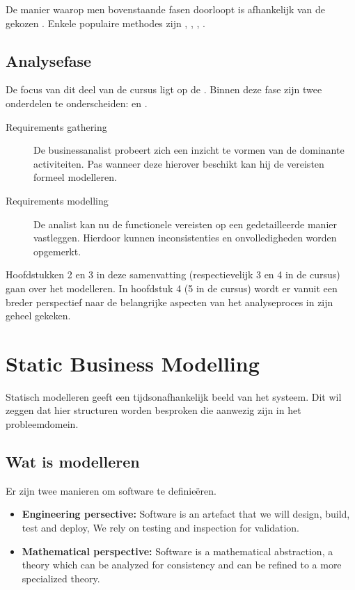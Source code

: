 \documentclass[../main.tex]{subfiles}
\begin{document}
\noindent
De manier waarop men bovenstaande fasen doorloopt is afhankelijk van de gekozen . Enkele populaire methodes zijn , , , .

\section{Analysefase}
De focus van dit deel van de cursus ligt op de . Binnen deze fase zijn twee onderdelen te onderscheiden:  en .

\begin{description}
	\item[Requirements gathering] De businessanalist probeert zich een inzicht te vormen van de dominante activiteiten. Pas wanneer deze hierover beschikt kan hij de vereisten formeel modelleren.
	\item[Requirements modelling] De analist kan nu de functionele vereisten op een gedetailleerde manier vastleggen. Hierdoor kunnen inconsistenties en onvolledigheden worden opgemerkt.
\end{description}
\noindent
Hoofdstukken 2 en 3 in deze samenvatting (respectievelijk 3 en 4 in de cursus) gaan over het modelleren. In hoofdstuk 4 (5 in de cursus) wordt er vanuit een breder perspectief naar de belangrijke aspecten van het analyseproces in zijn geheel gekeken.

\chapter{Static Business Modelling}
Statisch modelleren geeft een tijdsonafhankelijk beeld van het systeem. Dit wil zeggen dat hier  structuren worden besproken die aanwezig zijn in het probleemdomein.

\section{Wat is modelleren}
Er zijn twee manieren om software te definie\"eren.
\begin{itemize}
	\item \textbf{Engineering persective:} Software is an artefact that we will design, build, test and deploy, We rely on testing and inspection for validation.
	\item \textbf{Mathematical perspective:} Software is a mathematical abstraction, a theory which can be analyzed for consistency and can be refined to a more specialized theory.
\end{itemize}
\end{document}
